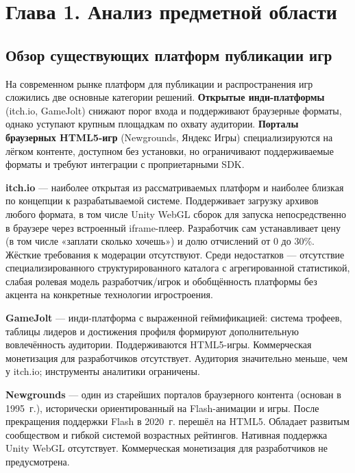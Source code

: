 \section*{Глава 1. Анализ предметной области}

\subsection{Обзор существующих платформ публикации игр}

На современном рынке платформ для публикации и распространения игр сложились две
основные категории решений. \textbf{Открытые инди-платформы} (itch.io, GameJolt)
снижают порог входа и поддерживают браузерные форматы, однако уступают крупным
площадкам по охвату аудитории. \textbf{Порталы браузерных HTML5-игр}
(Newgrounds, Яндекс Игры) специализируются на лёгком контенте, доступном без
установки, но ограничивают поддерживаемые форматы и требуют интеграции с
проприетарными SDK.

\textbf{itch.io} --- наиболее открытая из рассматриваемых платформ и наиболее
близкая по концепции к разрабатываемой системе. Поддерживает загрузку архивов любого
формата, в том числе Unity WebGL сборок для запуска непосредственно в браузере через
встроенный iframe-плеер. Разработчик сам устанавливает цену (в том числе «заплати
сколько хочешь») и долю отчислений от 0 до 30\%. Жёсткие требования к модерации
отсутствуют. Среди недостатков --- отсутствие специализированного структурированного
каталога с агрегированной статистикой, слабая ролевая модель разработчик/игрок
и обобщённость платформы без акцента на конкретные технологии игростроения.

\textbf{GameJolt} --- инди-платформа с выраженной геймификацией: система трофеев,
таблицы лидеров и достижения профиля формируют дополнительную вовлечённость аудитории.
Поддерживаются HTML5-игры. Коммерческая монетизация для разработчиков отсутствует.
Аудитория значительно меньше, чем у itch.io; инструменты аналитики ограничены.

\textbf{Newgrounds} --- один из старейших порталов браузерного контента (основан в
1995~г.), исторически ориентированный на Flash-анимации и игры. После прекращения
поддержки Flash в 2020~г. перешёл на HTML5. Обладает развитым сообществом и гибкой
системой возрастных рейтингов. Нативная поддержка Unity WebGL отсутствует.
Коммерческая монетизация для разработчиков не предусмотрена.

